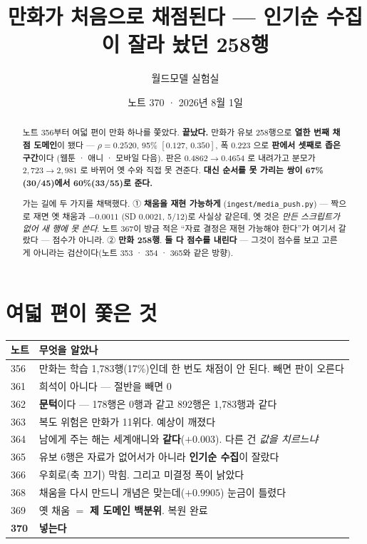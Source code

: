 \documentclass[11pt]{article}
\begin{document}
\title{만화가 처음으로 채점된다 --- 인기순 수집이 잘라 놨던 258행}
\author{월드모델 실험실}
\date{노트 370 · 2026년 8월 1일}
\maketitle

\begin{abstract}
노트 356부터 여덟 편이 만화 하나를 쫓았다. \textbf{끝났다.} 만화가 유보
258행으로 \textbf{열한 번째 채점 도메인}이 됐다 --- $\rho = 0.2520$,
95\% $[0.127,\,0.350]$, 폭 0.223 으로 \textbf{판에서 셋째로 좁은 구간}이다
(웹툰 · 애니 · 모바일 다음). 판은 $0.4862 \to 0.4654$ 로 내려가고 분모가
$2{,}723 \to 2{,}981$ 로 바뀌어 옛 수와 직접 못 견준다. \textbf{대신 순서를
못 가리는 쌍이 67\%(30/45)에서 60\%(33/55)로 준다.}

가는 길에 두 가지를 채택했다. ① \textbf{채움을 재현 가능하게}
(\texttt{ingest/media\_push.py}) --- 짝으로 재면 옛 채움과 $-0.0011$
(SD 0.0021, 5/12)로 사실상 같은데, 옛 것은 \emph{만든 스크립트가 없어
새 행에 못 쓴다}. 노트 367이 방금 적은 ``자료 결정은 재현 가능해야
한다''가 여기서 갈랐다 --- 점수가 아니라. ② \textbf{만화 258행}.
\textbf{둘 다 점수를 내린다} --- 그것이 점수를 보고 고른 게 아니라는
검산이다(노트 353 · 354 · 365와 같은 방향).
\end{abstract}

\section{여덟 편이 쫓은 것}

\begin{center}
\begin{tabular}{ll}
\hline
노트 & 무엇을 알았나 \\
\hline
356 & 만화는 학습 1,783행(17\%)인데 한 번도 채점이 안 된다. 빼면 판이 오른다 \\
361 & 희석이 아니다 --- 절반을 빼면 0 \\
362 & \textbf{문턱}이다 --- 178행은 0행과 같고 892행은 1,783행과 같다 \\
363 & 복도 위험은 만화가 11위다. 예상이 깨졌다 \\
364 & 남에게 주는 해는 세계애니와 \textbf{같다}($+0.003$). 다른 건 \emph{값을 치르느냐} \\
365 & 유보 6행은 자료가 없어서가 아니라 \textbf{인기순 수집}이 잘랐다 \\
366 & 우회로(축 끄기) 막힘. 그리고 미결정 폭이 낡았다 \\
368 & 채움을 다시 만드니 개념은 맞는데($+0.9905$) 눈금이 틀렸다 \\
369 & 옛 채움 $=$ \textbf{제 도메인 백분위}. 복원 완료 \\
\textbf{370} & \textbf{넣는다} \\
\hline
\end{tabular}
\end{center}
\end{document}
